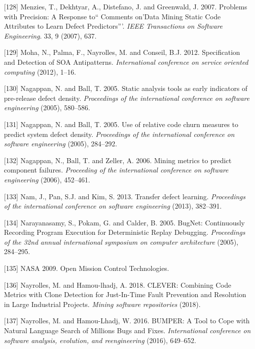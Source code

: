 \documentclass[12pt]{report}
\begin{document}
\hypertarget{ref-menzies2007problems}{}
{[}128{]} Menzies, T., Dekhtyar, A., Distefano, J. and Greenwald, J.
2007. Problems with Precision: A Response to`` Comments on'Data Mining
Static Code Attributes to Learn Defect Predictors'''. \emph{IEEE
Transactions on Software Engineering}. 33, 9 (2007), 637.

\hypertarget{ref-Moha}{}
{[}129{]} Moha, N., Palma, F., Nayrolles, M. and Conseil, B.J. 2012.
Specification and Detection of SOA Antipatterns. \emph{International
conference on service oriented computing} (2012), 1--16.

\hypertarget{ref-Nagappan2005}{}
{[}130{]} Nagappan, N. and Ball, T. 2005. Static analysis tools as early
indicators of pre-release defect density. \emph{Proceedings of the
international conference on software engineering} (2005), 580--586.

\hypertarget{ref-Nagappan}{}
{[}131{]} Nagappan, N. and Ball, T. 2005. Use of relative code churn
measures to predict system defect density. \emph{Proceedings of the
international conference on software engineering} (2005), 284--292.

\hypertarget{ref-Nagappan2006}{}
{[}132{]} Nagappan, N., Ball, T. and Zeller, A. 2006. Mining metrics to
predict component failures. \emph{Proceeding of the international
conference on software engineering} (2006), 452--461.

\hypertarget{ref-Nam2013}{}
{[}133{]} Nam, J., Pan, S.J. and Kim, S. 2013. Transfer defect learning.
\emph{Proceedings of the international conference on software
engineering} (2013), 382--391.

\hypertarget{ref-Narayanasamy2005}{}
{[}134{]} Narayanasamy, S., Pokam, G. and Calder, B. 2005. BugNet:
Continuously Recording Program Execution for Deterministic Replay
Debugging. \emph{Proceedings of the 32nd annual international symposium
on computer architecture} (2005), 284--295.

\hypertarget{ref-NASA2009}{}
{[}135{]} NASA 2009. Open Mission Control Technologies.

\hypertarget{ref-Nayrolles2018}{}
{[}136{]} Nayrolles, M. and Hamou-lhadj, A. 2018. CLEVER: Combining Code
Metrics with Clone Detection for Just-In-Time Fault Prevention and
Resolution in Large Industrial Projects. \emph{Mining software
repositories} (2018).

\hypertarget{ref-Nayrolles2016b}{}
{[}137{]} Nayrolles, M. and Hamou-Lhadj, W. 2016. BUMPER: A Tool to Cope
with Natural Language Search of Millions Bugs and Fixes.
\emph{International conference on software analysis, evolution, and
reengineering} (2016), 649--652.
\end{document}
